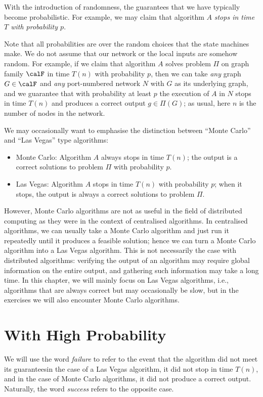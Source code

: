With the introduction of randomness, the guarantees that we have typically become probabilistic. For example, we may claim that algorithm $A$ \emph{stops in time $T$ with probability $p$}.

Note that all probabilities are over the random choices that the state machines make. We do not assume that our network or the local inputs are somehow random. For example, if we claim that algorithm $A$ solves problem $\Pi$ on graph family $\calF$ in time $T(n)$ with probability $p$, then we can take \emph{any} graph $G \in \calF$ and \emph{any} port-numbered network $N$ with $G$ as its underlying graph, and we guarantee that with probability at least $p$ the execution of $A$ in $N$ stops in time $T(n)$ and produces a correct output $g \in \Pi(G)$; as usual, here $n$ is the number of nodes in the network.

We may occasionally want to emphasise the distinction between ``Monte Carlo'' and ``Las Vegas'' type algorithms:
\begin{itemize}
    \item Monte Carlo: Algorithm $A$ always stops in time $T(n)$; the output is a correct solutions to problem $\Pi$ with probability $p$.
    \item Las Vegas: Algorithm $A$ stops in time $T(n)$ with probability $p$; when it stops, the output is always a correct solutions to problem $\Pi$.
\end{itemize}
However, Monte Carlo algorithms are not as useful in the field of distributed computing as they were in the context of centralised algorithms. In centralised algorithms, we can usually take a Monte Carlo algorithm and just run it repeatedly until it produces a feasible solution; hence we can turn a Monte Carlo algorithm into a Las Vegas algorithm. This is not necessarily the case with distributed algorithms: verifying the output of an algorithm may require global information on the entire output, and gathering such information may take a long time. In this chapter, we will mainly focus on Las Vegas algorithms, i.e., algorithms that are always correct but may occasionally be slow, but in the exercises we will also encounter Monte Carlo algorithms.


\section{With High Probability}

We will use the word \emph{failure} to refer to the event that the algorithm did not meet its guarantees\mydash in the case of a Las Vegas algorithm, it did not stop in time $T(n)$, and in the case of Monte Carlo algorithms, it did not produce a correct output. Naturally, the word \emph{success} refers to the opposite case.

